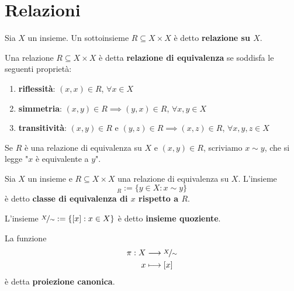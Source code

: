 \documentclass[../main.tex]{subfiles}
\begin{document}
\section{Relazioni}

\begin{definition}[Relazione]
    Sia $X$ un insieme. Un sottoinsieme $R \subseteq X \times X$ è detto \textbf{relazione su $X$}.
\end{definition}

\begin{definition}
    Una relazione $R \subseteq X \times X$ è detta \textbf{relazione di equivalenza} se soddisfa le seguenti proprietà:
    \begin{enumerate}[label=(\roman*)]
        \item \textbf{riflessità}: $(x,x) \in R$, $\forall x \in X$
        \item \textbf{simmetria}: $(x,y) \in R \implies (y,x) \in R$, $\forall x,y \in X$
        \item \textbf{transitività}: $(x,y) \in R \text{ e } (y,z) \in R \implies (x,z) \in R$, $\forall x,y,z \in X$
    \end{enumerate}
\end{definition}

Se $R$ è una relazione di equivalenza su $X$ e $(x,y) \in R$, scriviamo $x \sim y$, che si legge "$x$ è equivalente a $y$".

\begin{definition}
    Sia $X$ un insieme e $R \subseteq X \times X$ una relazione di equivalenza su $X$. L'insieme
    \begin{equation*}
        [x]_R := \{y \in X : x \sim y\}
    \end{equation*}
    è detto \textbf{classe di equivalenza di $x$ rispetto a $R$}.
\end{definition}

\begin{definition}
    L'insieme $\nicefrac{X}{\sim} := \{[x] : x \in X\}$ è detto \textbf{insieme quoziente}.
\end{definition}

\begin{definition}
    La funzione
    \begin{align*}
        \pi : X & \longrightarrow \nicefrac{X}{\sim} \\
        x       & \longmapsto [x]
    \end{align*}
    è detta \textbf{proiezione canonica}.
\end{definition}
\end{document}
